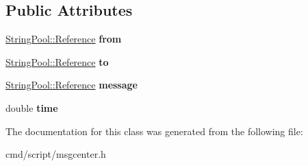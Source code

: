 \subsection*{Public Attributes}
\begin{DoxyCompactItemize}
\item 
\hyperlink{classSharedPool_1_1Reference}{String\+Pool\+::\+Reference} {\bfseries from}\hypertarget{classgameMessage_aa407d67cf72f47e11f84cd8de53128fc}{}\label{classgameMessage_aa407d67cf72f47e11f84cd8de53128fc}

\item 
\hyperlink{classSharedPool_1_1Reference}{String\+Pool\+::\+Reference} {\bfseries to}\hypertarget{classgameMessage_aae0411ad856a40777a62fe2bcf1fd4fb}{}\label{classgameMessage_aae0411ad856a40777a62fe2bcf1fd4fb}

\item 
\hyperlink{classSharedPool_1_1Reference}{String\+Pool\+::\+Reference} {\bfseries message}\hypertarget{classgameMessage_a382b03a43ee7bfc5d3e3ede2cde0e160}{}\label{classgameMessage_a382b03a43ee7bfc5d3e3ede2cde0e160}

\item 
double {\bfseries time}\hypertarget{classgameMessage_a348df57eec181888c499efbd7a99f1d1}{}\label{classgameMessage_a348df57eec181888c499efbd7a99f1d1}

\end{DoxyCompactItemize}


The documentation for this class was generated from the following file\+:\begin{DoxyCompactItemize}
\item 
cmd/script/msgcenter.\+h\end{DoxyCompactItemize}
